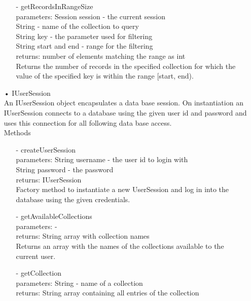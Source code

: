 \documentclass[oneside, english, final]{design}
\begin{document}
\begin{itemize}
\begin{itemize}
		      \item[-]getRecordsInRangeSize
		            \\parameters: Session session - the current session
		            \\String - name of the collection to query
		            \\String key - the parameter used for filtering
		            \\String start and end - range for the filtering
		            \\returns: number of elements matching the range as int
		            \\Returns the number of records in the specified
		            collection for which the value of the specified
		            key is within the range [start, end).
	      \end{itemize}

	\newpage
	\item[•]IUserSession
	      \\An IUserSession object encapsulates a data base session.
	      On instantiation an IUserSession connects to a database using
	      the given user id and password and uses this connection for
	      all following data base access.
	      \\Methods
	      \begin{itemize}
		      \item[-]createUserSession
		            \\parameters: String username - the user id to login with
		            \\String password - the password
		            \\returns: IUserSession
		            \\Factory method to instantiate a new UserSession and log in into the database using the given credentials.

		      \item[-]getAvailableCollections
		            \\parameters: -
		            \\returns: String array with collection names
		            \\Returns an array with the names of the collections available to the current user.

		      \item[-]getCollection
		            \\parameters: String - name of a collection
		            \\returns: String array containing all entries of the collection


\end{itemize}
\end{itemize}
\end{document}
